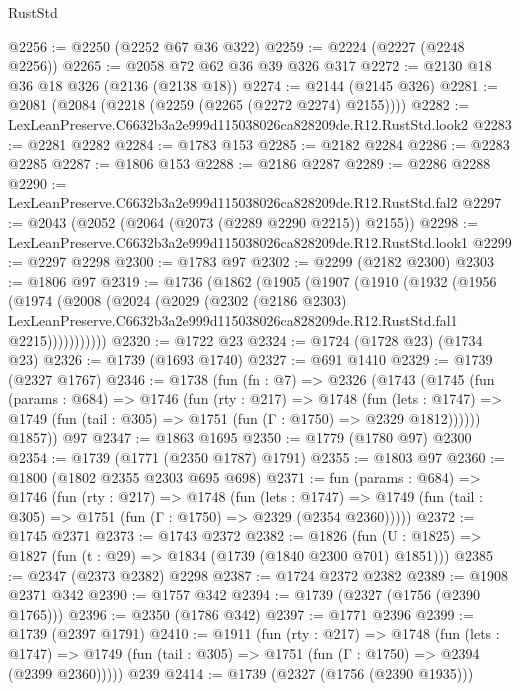 \begin{lexlean}{RustStd}
\begin{coremodule}
@2256 := @2250 (@2252 @67 @36 @322)
@2259 := @2224 (@2227 (@2248 @2256))
@2265 := @2058 @72 @62 @36 @39 @326 @317
@2272 := @2130 @18 @36 @18 @326 (@2136 (@2138 @18))
@2274 := @2144 (@2145 @326)
@2281 := @2081 (@2084 (@2218 (@2259 (@2265 (@2272 @2274) @2155))))
@2282 := LexLeanPreserve.C6632b3a2e999d115038026ca828209de.R12.RustStd.look2
@2283 := @2281 @2282
@2284 := @1783 @153
@2285 := @2182 @2284
@2286 := @2283 @2285
@2287 := @1806 @153
@2288 := @2186 @2287
@2289 := @2286 @2288
@2290 := LexLeanPreserve.C6632b3a2e999d115038026ca828209de.R12.RustStd.fal2
@2297 := @2043 (@2052 (@2064 (@2073 (@2289 @2290 @2215)) @2155))
@2298 := LexLeanPreserve.C6632b3a2e999d115038026ca828209de.R12.RustStd.look1
@2299 := @2297 @2298
@2300 := @1783 @97
@2302 := @2299 (@2182 @2300)
@2303 := @1806 @97
@2319 := @1736
    (@1862
      (@1905
        (@1907
          (@1910
            (@1932
              (@1956
                (@1974
                  (@2008
                    (@2024
                      (@2029
                        (@2302
                          (@2186 @2303)
                          LexLeanPreserve.C6632b3a2e999d115038026ca828209de.R12.RustStd.fal1
                          @2215)))))))))))
@2320 := @1722 @23
@2324 := @1724 (@1728 @23) (@1734 @23)
@2326 := @1739 (@1693 @1740)
@2327 := @691 @1410
@2329 := @1739 (@2327 @1767)
@2346 := @1738
    (fun (fn : @7) =>
    @2326
      (@1743
        (@1745
          (fun (params : @684) =>
          @1746
            (fun (rty : @217) =>
            @1748
              (fun (lets : @1747) =>
              @1749 (fun (tail : @305) => @1751 (fun (Γ : @1750) => @2329 @1812))))))
        @1857))
    @97
@2347 := @1863 @1695
@2350 := @1779 (@1780 @97) @2300
@2354 := @1739 (@1771 (@2350 @1787) @1791)
@2355 := @1803 @97
@2360 := @1800 (@1802 @2355 @2303 @695 @698)
@2371 := fun (params : @684) =>
  @1746
    (fun (rty : @217) =>
    @1748
      (fun (lets : @1747) =>
      @1749 (fun (tail : @305) => @1751 (fun (Γ : @1750) => @2329 (@2354 @2360)))))
@2372 := @1745 @2371
@2373 := @1743 @2372
@2382 := @1826 (fun (U : @1825) => @1827 (fun (t : @29) => @1834 (@1739 (@1840 @2300 @701) @1851)))
@2385 := @2347 (@2373 @2382) @2298
@2387 := @1724 @2372 @2382
@2389 := @1908 @2371 @342
@2390 := @1757 @342
@2394 := @1739 (@2327 (@1756 (@2390 @1765)))
@2396 := @2350 (@1786 @342)
@2397 := @1771 @2396
@2399 := @1739 (@2397 @1791)
@2410 := @1911
    (fun (rty : @217) =>
    @1748
      (fun (lets : @1747) =>
      @1749 (fun (tail : @305) => @1751 (fun (Γ : @1750) => @2394 (@2399 @2360)))))
    @239
@2414 := @1739 (@2327 (@1756 (@2390 @1935)))

\end{coremodule}
\end{lexlean}
